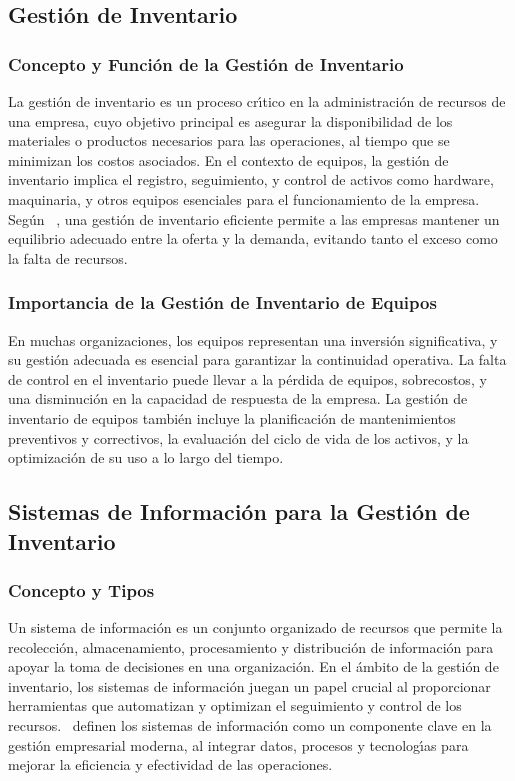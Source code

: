 \documentclass[stu, 12pt, letterpaper, donotrepeattitle, floatsintext, natbib]{apa7}
\begin{document}
\subsection{Gesti\'on de Inventario}
\subsubsection{Concepto y Funci\'on de la Gesti\'on de Inventario}
La gesti\'on de inventario es un proceso cr\'{\i}tico en la administraci\'on de recursos de una empresa, cuyo objetivo principal es asegurar la disponibilidad de
los materiales o productos necesarios para las operaciones, al tiempo que se minimizan los costos asociados. En el contexto de equipos, la gesti\'on de inventario
implica el registro, seguimiento, y control de activos como hardware, maquinaria, y otros equipos esenciales para el funcionamiento de la empresa. Seg\'un~\cite{cja}
, una gesti\'on de inventario eficiente permite a las empresas mantener un equilibrio adecuado entre la oferta y la demanda, evitando tanto el exceso como la falta de
recursos.
\subsubsection{Importancia de la Gesti\'on de Inventario de Equipos}
En muchas organizaciones, los equipos representan una inversi\'on significativa, y su gesti\'on adecuada es esencial para garantizar la continuidad operativa. La
falta de control en el inventario puede llevar a la p\'erdida de equipos, sobrecostos, y una disminuci\'on en la capacidad de respuesta de la empresa. La gesti\'on
de inventario de equipos tambi\'en incluye la planificaci\'on de mantenimientos preventivos y correctivos, la evaluaci\'on del ciclo de vida de los activos, y la
optimizaci\'on de su uso a lo largo del tiempo.
\subsection{Sistemas de Informaci\'on para la Gesti\'on de Inventario}
\subsubsection{Concepto y Tipos}
Un sistema de informaci\'on es un conjunto organizado de recursos que permite la recolecci\'on, almacenamiento, procesamiento y distribuci\'on de informaci\'on para
apoyar la toma de decisiones en una organizaci\'on. En el \'ambito de la gesti\'on de inventario, los sistemas de informaci\'on juegan un papel crucial al
proporcionar herramientas que automatizan y optimizan el seguimiento y control de los recursos.~\cite{om} definen los sistemas de informaci\'on como un componente
clave en la gesti\'on empresarial moderna, al integrar datos, procesos y tecnolog\'{\i}as para mejorar la eficiencia y efectividad de las operaciones.
\end{document}
